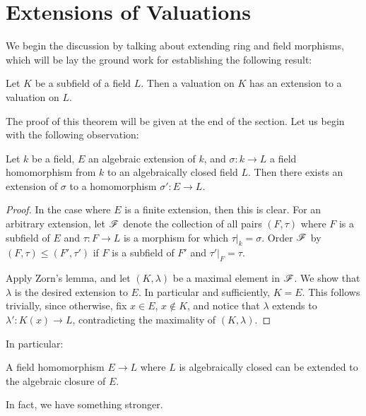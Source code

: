 \section{Extensions of Valuations}

We begin the discussion by talking about extending ring and field 
morphisms, which will be lay the ground work for establishing the 
following result:

\begin{thm}\label{thm_ext_val}
Let $K$ be a subfield of a field $L$. Then a valuation on $K$ has 
an extension to a valuation on $L$.
\end{thm}

The proof of this theorem will be given at the end of the section.
Let us begin with the following observation:

\begin{prop}\label{prop_lang_2_8}
Let $k$ be a field, $E$ an algebraic extension of $k$, and 
$\sigma: k \to L$ a field homomorphism from $k$ to an 
algebraically closed field $L$. Then there exists an extension of 
$\sigma$ to a homomorphism $\sigma': E \to L$.
\end{prop}

\begin{proof}
In the case where $E$ is a finite extension, then this is clear.
For an arbitrary extension, let $\mathscr{F}$ denote the collection
of all pairs $(F, \tau)$ where $F$ is a subfield of $E$ and 
$\tau: F \to L$ is a morphism for which $\tau|_k = \sigma$. 
Order $\mathscr{F}$ by $(F, \tau) \leq (F', \tau')$ if $F$ is a 
subfield of $F'$ and $\tau'|_F = \tau$.

Apply Zorn's lemma, and let $(K, \lambda)$ be a maximal element
in $\mathscr{F}$. We show that $\lambda$ is the desired extension to 
$E$. In particular and sufficiently, $K = E$. This follows 
trivially, since otherwise, fix $x \in E$, $x \notin K$, and 
notice that $\lambda$ extends to $\lambda': K(x) \to L$, 
contradicting the maximality of $(K, \lambda)$.
\end{proof}

In particular:

\begin{cor}
A field homomorphism $E \to L$ where $L$ is algebraically closed
can be extended to the algebraic closure of $E$.
\end{cor}

In fact, we have something stronger.

